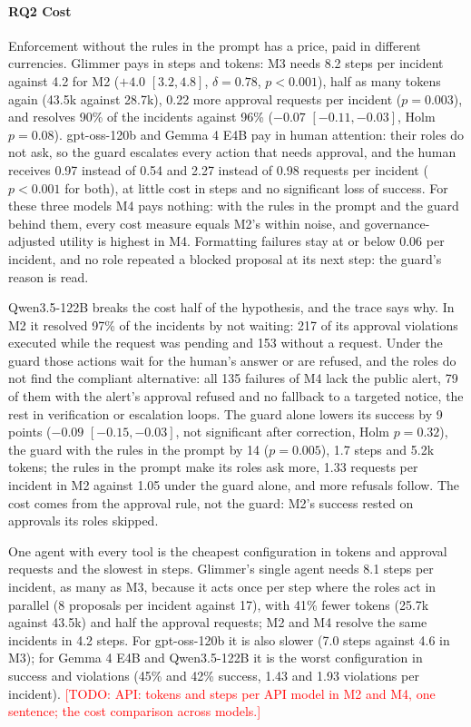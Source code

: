 \documentclass[10pt,conference]{IEEEtran}
\newcommand{\todo}[1]{\textcolor{red}{[TODO: #1]}}
\newcommand{\RQ}[1]{\textbf{RQ#1}}
\begin{document}
\paragraph{\RQ{2} Cost}
Enforcement without the rules in the prompt has a price, paid in different currencies. Glimmer pays in steps and tokens: M3 needs 8.2 steps per incident against 4.2 for M2 ($+4.0$ $[3.2, 4.8]$, $\delta = 0.78$, $p < 0.001$), half as many tokens again (43.5k against 28.7k), 0.22 more approval requests per incident ($p = 0.003$), and resolves 90\% of the incidents against 96\% ($-0.07$ $[-0.11, -0.03]$, Holm $p = 0.08$). gpt-oss-120b and Gemma 4 E4B pay in human attention: their roles do not ask, so the guard escalates every action that needs approval, and the human receives 0.97 instead of 0.54 and 2.27 instead of 0.98 requests per incident ($p < 0.001$ for both), at little cost in steps and no significant loss of success. For these three models M4 pays nothing: with the rules in the prompt and the guard behind them, every cost measure equals M2's within noise, and governance-adjusted utility is highest in M4. Formatting failures stay at or below 0.06 per incident, and no role repeated a blocked proposal at its next step: the guard's reason is read.

Qwen3.5-122B breaks the cost half of the hypothesis, and the trace says why. In M2 it resolved 97\% of the incidents by not waiting: 217 of its approval violations executed while the request was pending and 153 without a request. Under the guard those actions wait for the human's answer or are refused, and the roles do not find the compliant alternative: all 135 failures of M4 lack the public alert, 79 of them with the alert's approval refused and no fallback to a targeted notice, the rest in verification or escalation loops. The guard alone lowers its success by 9 points ($-0.09$ $[-0.15, -0.03]$, not significant after correction, Holm $p = 0.32$), the guard with the rules in the prompt by 14 ($p = 0.005$), 1.7 steps and 5.2k tokens; the rules in the prompt make its roles ask more, 1.33 requests per incident in M2 against 1.05 under the guard alone, and more refusals follow. The cost comes from the approval rule, not the guard: M2's success rested on approvals its roles skipped.

One agent with every tool is the cheapest configuration in tokens and approval requests and the slowest in steps. Glimmer's single agent needs 8.1 steps per incident, as many as M3, because it acts once per step where the roles act in parallel (8 proposals per incident against 17), with 41\% fewer tokens (25.7k against 43.5k) and half the approval requests; M2 and M4 resolve the same incidents in 4.2 steps. For gpt-oss-120b it is also slower (7.0 steps against 4.6 in M3); for Gemma 4 E4B and Qwen3.5-122B it is the worst configuration in success and violations (45\% and 42\% success, 1.43 and 1.93 violations per incident). \todo{API: tokens and steps per API model in M2 and M4, one sentence; the cost comparison across models.}
\end{document}
